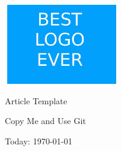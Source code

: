 \documentclass[a4paper]{article}
\begin{document}
\begin{titlepage}
    \centering
    \includegraphics[width=5cm,height=3.5cm]{Images/logo.jpg} \par\vspace{1cm}
    {\centering
    \LARGE Article Template\par
    Copy Me and Use Git\par
    }
    \vspace{1.5cm}
    {Today: \large \today\par}
\end{titlepage}

\tableofcontents



\end{document}
